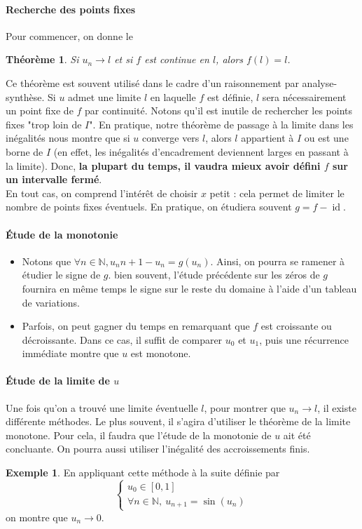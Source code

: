 \documentclass[french]{book}
\newcommand{\N}{\mathbb{N}}
\theoremstyle{plain}
\newtheorem{thm}{Théorème}[chapter]
\theoremstyle{definition}
\newtheorem{exa}{Exemple}[chapter]
\theoremstyle{remark}
\DeclareMathOperator{\id}{id}
\begin{document}
\paragraph{Recherche des points fixes}  Pour commencer, on donne le
\begin{thm}
	Si $u_n\rightarrow l$ et si $f$ est continue en $l$, alors $f(l)=l$.
\end{thm}
Ce théorème est souvent utilisé dans le cadre d'un raisonnement par analyse-synthèse. Si $u$ admet une limite $l$ en laquelle $f$ est définie, $l$ sera nécessairement un point fixe de $f$ par continuité. Notons qu'il est inutile de rechercher les points fixes "trop loin de $I$". En pratique, notre théorème de passage à la limite dans les inégalités nous montre que si $u$ converge vers $l$, alors $l$ appartient à $I$ ou est une borne de $I$ (en effet, les inégalités d'encadrement deviennent larges en passant à la limite). Donc, \textbf{la plupart du temps, il vaudra mieux avoir défini $f$ sur un intervalle fermé}. \\ En tout cas, on comprend l'intérêt de choisir $x$ petit :  cela permet de limiter le nombre de points fixes éventuels. En pratique, on étudiera souvent $g=f-\id$. \\
\paragraph{Étude de la monotonie} \begin{itemize}
	\item Notons que $\forall n\in\N,u_n{n+1}-u_n=g(u_n)$. Ainsi, on pourra se ramener à étudier le signe de $g$. bien souvent, l'étude précédente sur les zéros de $g$ fournira en même temps le signe sur le reste du domaine à l'aide d'un tableau de variations.
	\item Parfois, on peut gagner du temps en remarquant que $f$ est croissante ou décroissante. Dans ce cas, il suffit de comparer $u_0$ et $u_1$, puis une récurrence immédiate montre que $u$ est monotone.
\end{itemize} 
\paragraph{Étude de la limite de $u$}  Une fois qu'on a trouvé une limite éventuelle $l$, pour montrer que $u_n\rightarrow l$, il existe différente méthodes. Le plus souvent, il s'agira d'utiliser le théorème de la limite monotone. Pour cela, il faudra que l'étude de la monotonie de $u$ ait été concluante. On pourra aussi utiliser l'inégalité des accroissements finis.
\begin{exa}
	En appliquant cette méthode à la suite définie par $$\left \{\begin{array}{ll}u_0\in[0,1] \\ \forall n\in\N,\ u_{n+1}=\sin(u_n)\end{array}\right.$$ on montre que $u_n\rightarrow 0$.
\end{exa}
\end{document}
